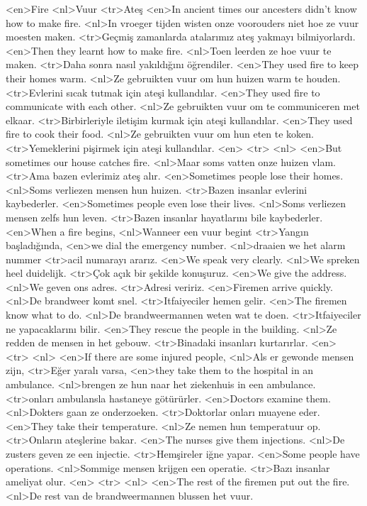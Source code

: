<en>Fire 
<nl>Vuur 
<tr>Ateş 
<en>In ancient times our ancesters didn’t know how to make fire.
<nl>In vroeger tijden wisten onze voorouders niet hoe ze vuur moesten maken.
<tr>Geçmiş zamanlarda atalarımız ateş yakmayı bilmiyorlardı.
<en>Then they learnt how to make fire.
<nl>Toen leerden ze hoe vuur te maken.
<tr>Daha sonra nasıl yakıldığını öğrendiler.
<en>They used fire to keep their homes warm.
<nl>Ze gebruikten vuur om hun huizen warm te houden.
<tr>Evlerini sıcak tutmak için ateşi kullandılar.
<en>They used fire to communicate with each other.
<nl>Ze gebruikten vuur om te communiceren met elkaar.
<tr>Birbirleriyle iletişim kurmak için ateşi kullandılar.
<en>They used fire to cook their food.
<nl>Ze gebruikten vuur om hun eten te koken.
<tr>Yemeklerini pişirmek için ateşi kullandılar.
<en>
<tr>
<nl>
<en>But sometimes our house  catches fire.
<nl>Maar soms vatten onze huizen vlam.
<tr>Ama bazen evlerimiz ateş alır.
<en>Sometimes people lose their homes.
<nl>Soms verliezen mensen hun huizen.
<tr>Bazen insanlar evlerini kaybederler.
<en>Sometimes people even lose their lives.
<nl>Soms verliezen mensen zelfs hun leven.
<tr>Bazen insanlar hayatlarını bile kaybederler.
<en>When a fire begins,
<nl>Wanneer een vuur begint
<tr>Yangın başladığında,
<en>we dial the emergency number.
<nl>draaien we het alarm nummer
<tr>acil numarayı ararız.
<en>We speak very clearly.
<nl>We spreken heel duidelijk.
<tr>Çok açık bir şekilde konuşuruz.
<en>We give the address.
<nl>We geven ons adres.
<tr>Adresi veririz.
<en>Firemen  arrive quickly.
<nl>De brandweer komt snel. 
<tr>Itfaiyeciler hemen gelir.
<en>The firemen know what to do.
<nl>De brandweermannen weten wat te doen.
<tr>Itfaiyeciler ne yapacaklarını bilir.
<en>They rescue the  people in the building.
<nl>Ze redden de mensen in het gebouw.
<tr>Binadaki insanları kurtarırlar.
<en>
<tr>
<nl>
<en>If there are some injured people,
<nl>Als er gewonde mensen zijn,
<tr>Eğer yaralı varsa,
<en>they take them to the hospital in an ambulance.
<nl>brengen ze hun naar het ziekenhuis in een ambulance.
<tr>onları ambulansla hastaneye götürürler.
<en>Doctors examine them.
<nl>Dokters gaan ze onderzoeken.
<tr>Doktorlar onları muayene eder.
<en>They take their temperature.
<nl>Ze nemen hun temperatuur op.
<tr>Onların ateşlerine bakar.
<en>The nurses give them injections.
<nl>De zusters geven ze een injectie.
<tr>Hemşireler iğne yapar.
<en>Some people have operations.
<nl>Sommige mensen krijgen een operatie.
<tr>Bazı insanlar ameliyat olur.
<en>
<tr>
<nl>
<en>The rest of the firemen put out the fire.
<nl>De rest van de brandweermannen blussen het vuur.
